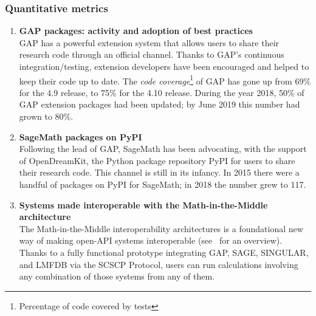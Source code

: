 \subsubsection{Quantitative metrics}

\begin{enumerate}
\item \textbf{GAP packages: activity and adoption of best practices}\\
  GAP has a powerful extension system that allows users to share their
  research code through an official channel. Thanks to GAP's
  continuous integration/testing, extension developers have been
  encouraged and helped to keep their code up to date. The \emph{code
    coverage}\footnote{Percentage of code covered by tests} of GAP has
  gone up from 69\% for the 4.9 release, to 75\% for the 4.10 release.
  During the year 2018, 50\% of GAP extension packages had been
  updated; by June 2019 this number had grown to 80\%.
\item \textbf{SageMath packages on PyPI}\\
  Following the lead of GAP, SageMath has been advocating, with the
  support of OpenDreamKit, the Python package repository PyPI for
  users to share their research code. This channel is still in its
  infancy. In 2015 there were a handful of packages on PyPI for
  SageMath; in 2018 the number grew to 117.

\item \textbf{Systems made interoperable with the Math-in-the-Middle architecture}\\

  The Math-in-the-Middle interoperability architectures is a
  foundational new way of making open-API systems interoperable
  (see~\cite{ODK-D6.5} for an overview). Thanks to a fully functional
  prototype integrating GAP, SAGE, SINGULAR, and LMFDB via the SCSCP
  Protocol, users can run calculations involving any combination of
  those systems from any of them.


\end{enumerate}
